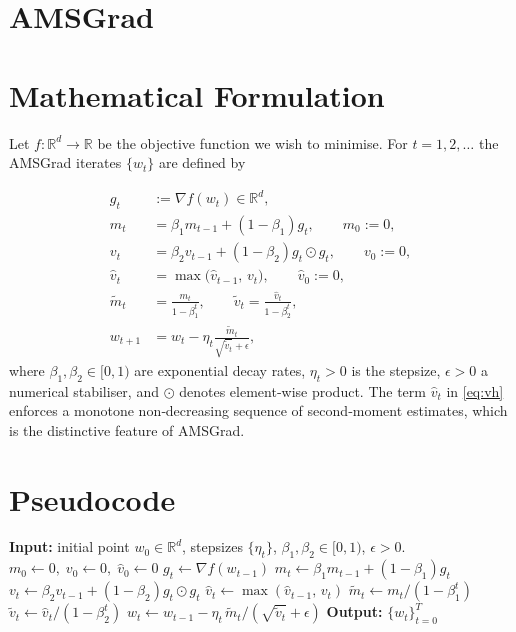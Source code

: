 \documentclass{article}
\newcommand{\R}{\mathbb{R}}
\begin{document}
\section*{AMSGrad}

\section*{Mathematical Formulation}
Let $f:\R^{d}\rightarrow\R$ be the objective function we wish to minimise.
For $t=1,2,\dots$ the AMSGrad iterates $\{w_t\}$ are defined by  

\begin{align}
g_t &:= \nabla f(w_t) \in \R^{d}, \label{eq:grad}\\[4pt]
m_t &= \beta_1 m_{t-1} + (1-\beta_1) g_t, \qquad m_0:=0, \label{eq:m}\\[4pt]
v_t &= \beta_2 v_{t-1} + (1-\beta_2) g_t\odot g_t, \qquad v_0:=0, \label{eq:v}\\[4pt]
\hat v_t &= \max\!\big(\hat v_{t-1},\, v_t\big), \qquad \hat v_0:=0, \label{eq:vh}\\[4pt]
\tilde m_t &= \frac{m_t}{1-\beta_1^{t}}, \qquad 
\tilde v_t = \frac{\hat v_t}{1-\beta_2^{t}}, \label{eq:bias}\\[4pt]
w_{t+1} &= w_t - \eta_t \frac{\tilde m_t}{\sqrt{\tilde v_t}+\epsilon}, \label{eq:update}
\end{align}
where $\beta_1,\beta_2\in[0,1)$ are exponential decay rates, $\eta_t>0$ is the stepsize,
$\epsilon>0$ a numerical stabiliser, and $\odot$ denotes element‑wise product.
The term $\hat v_t$ in \eqref{eq:vh} enforces a monotone non‑decreasing
sequence of second‑moment estimates, which is the distinctive feature of AMSGrad.

\section*{Pseudocode}
\begin{algorithm}[H]
\caption{AMSGrad}
\begin{algorithmic}[1]
\State \textbf{Input:} initial point $w_0\in\R^{d}$, stepsizes $\{\eta_t\}$,
$\beta_1,\beta_2\in[0,1)$, $\epsilon>0$.
\State $m_0\gets 0,\; v_0\gets 0,\; \hat v_0\gets 0$
    \State $g_t \gets \nabla f(w_{t-1})$
    \State $m_t \gets \beta_1 m_{t-1} + (1-\beta_1) g_t$
    \State $v_t \gets \beta_2 v_{t-1} + (1-\beta_2) g_t\odot g_t$
    \State $\hat v_t \gets \max(\hat v_{t-1},\, v_t)$ 
    \State $\tilde m_t \gets m_t/(1-\beta_1^{t})$
    \State $\tilde v_t \gets \hat v_t/(1-\beta_2^{t})$
    \State $w_t \gets w_{t-1} - \eta_t \, \tilde m_t/(\sqrt{\tilde v_t}+\epsilon)$
\EndFor
\State \textbf{Output:} $\{w_t\}_{t=0}^{T}$
\end{algorithmic}
\end{algorithm}
\end{document}
